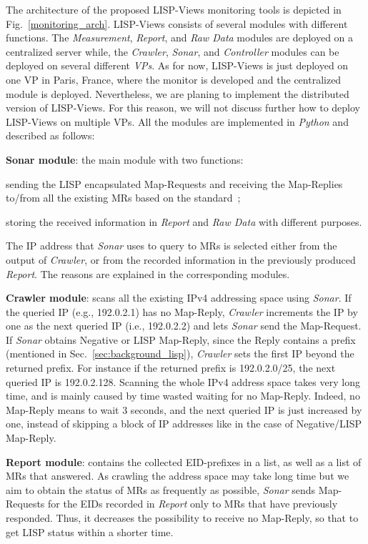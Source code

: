 The architecture of the proposed LISP-Views monitoring tools is depicted in Fig.~\ref{monitoring_arch}.  LISP-Views consists of several modules with different functions. The \emph{Measurement}, \emph{Report}, and \emph{Raw Data} modules are deployed on a centralized server while, the \emph{Crawler}, \emph{Sonar}, and \emph{Controller} modules can be deployed on several different \emph{VPs}.  As for now, LISP-Views is just deployed on one VP in Paris, France, where the monitor is developed and the centralized module is deployed. Nevertheless, we are planing to implement the distributed version of LISP-Views. For this reason, we will not discuss further how to deploy LISP-Views on multiple VPs. All the modules are implemented in \emph{Python} and described as follows:

\textbf{Sonar module}: the main module with two functions:
\begin{enumerate*}
   \item sending the LISP encapsulated Map-Requests and receiving the Map-Replies to/from all the existing MRs based on the standard~\cite{rfc6830};
   \item storing the received information in \emph{Report} and \emph{Raw Data} with different purposes.
\end{enumerate*}

The IP address that \emph{Sonar} uses to query to MRs is selected  either from the output of \emph{Crawler}, or from the recorded information in the previously produced \emph{Report}. The reasons are explained in the corresponding modules.

\textbf{Crawler module}: scans all the existing IPv4 addressing space using \emph{Sonar}.  If the queried IP (e.g., 192.0.2.1) has no Map-Reply, \emph{Crawler} increments the IP by one as the next queried IP (i.e., 192.0.2.2) and lets \emph{Sonar} send the Map-Request. If \emph{Sonar} obtains Negative or LISP Map-Reply, since the Reply contains a prefix (mentioned in Sec.~\ref{sec:background_lisp}), \emph{Crawler} sets the first IP beyond the returned prefix.  For instance if the returned prefix is 192.0.2.0/25, the next queried IP is 192.0.2.128.  Scanning the whole IPv4 address space takes very long time, and is mainly caused by time wasted waiting for no Map-Reply.  Indeed, no Map-Reply means to wait 3 seconds, and the next queried IP is just increased by one, instead of skipping a block of IP addresses like in the case of Negative/LISP Map-Reply.

\textbf{Report module}: contains the collected EID-prefixes in a list, as well as a list of MRs that answered. As crawling the address space may take long time but we aim to obtain the status of MRs as frequently as possible, \emph{Sonar} sends Map-Requests for the EIDs recorded in \emph{Report} only to MRs that have previously responded. Thus, it decreases the possibility to receive no Map-Reply, so that to get LISP status within a shorter time.

